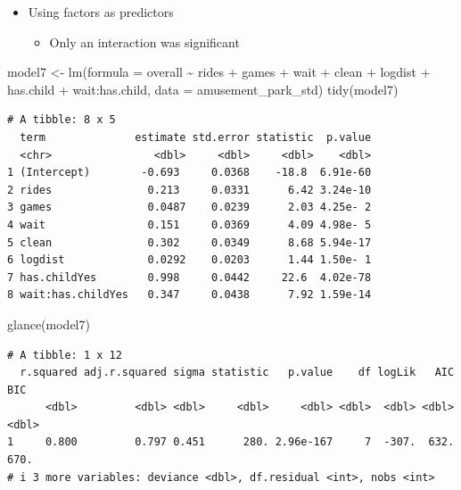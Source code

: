 \documentclass[
  ignorenonframetext,
]{beamer}
\newenvironment{Shaded}{\begin{snugshade}}{\end{snugshade}}
\newcommand{\AttributeTok}[1]{\textcolor[rgb]{0.40,0.45,0.13}{#1}}
\newcommand{\FunctionTok}[1]{\textcolor[rgb]{0.28,0.35,0.67}{#1}}
\newcommand{\NormalTok}[1]{\textcolor[rgb]{0.00,0.23,0.31}{#1}}
\newcommand{\OtherTok}[1]{\textcolor[rgb]{0.00,0.23,0.31}{#1}}
\newcommand{\SpecialCharTok}[1]{\textcolor[rgb]{0.37,0.37,0.37}{#1}}
\providecommand{\tightlist}{%
  \setlength{\itemsep}{0pt}\setlength{\parskip}{0pt}}\usepackage{longtable,booktabs,array}
\begin{document}
\begin{frame}[fragile]{}
\label{section-40}
\begin{itemize}
\item
  Using factors as predictors

  \begin{itemize}
  \tightlist
  \item
    Only an interaction was significant
  \end{itemize}
\end{itemize}

\tiny

\begin{Shaded}
\begin{Highlighting}[]
\NormalTok{model7 }\OtherTok{\textless{}{-}} \FunctionTok{lm}\NormalTok{(}\AttributeTok{formula =}\NormalTok{ overall }\SpecialCharTok{\textasciitilde{}}\NormalTok{ rides }\SpecialCharTok{+}\NormalTok{ games }\SpecialCharTok{+}\NormalTok{ wait }\SpecialCharTok{+}\NormalTok{ clean }\SpecialCharTok{+}\NormalTok{ logdist }\SpecialCharTok{+}\NormalTok{ has.child }\SpecialCharTok{+}
\NormalTok{                       wait}\SpecialCharTok{:}\NormalTok{has.child, }\AttributeTok{data =}\NormalTok{ amusement\_park\_std)}
\FunctionTok{tidy}\NormalTok{(model7)}
\end{Highlighting}
\end{Shaded}

\begin{verbatim}
# A tibble: 8 x 5
  term              estimate std.error statistic  p.value
  <chr>                <dbl>     <dbl>     <dbl>    <dbl>
1 (Intercept)        -0.693     0.0368    -18.8  6.91e-60
2 rides               0.213     0.0331      6.42 3.24e-10
3 games               0.0487    0.0239      2.03 4.25e- 2
4 wait                0.151     0.0369      4.09 4.98e- 5
5 clean               0.302     0.0349      8.68 5.94e-17
6 logdist             0.0292    0.0203      1.44 1.50e- 1
7 has.childYes        0.998     0.0442     22.6  4.02e-78
8 wait:has.childYes   0.347     0.0438      7.92 1.59e-14
\end{verbatim}

\begin{Shaded}
\begin{Highlighting}[]
\FunctionTok{glance}\NormalTok{(model7)}
\end{Highlighting}
\end{Shaded}

\begin{verbatim}
# A tibble: 1 x 12
  r.squared adj.r.squared sigma statistic   p.value    df logLik   AIC   BIC
      <dbl>         <dbl> <dbl>     <dbl>     <dbl> <dbl>  <dbl> <dbl> <dbl>
1     0.800         0.797 0.451      280. 2.96e-167     7  -307.  632.  670.
# i 3 more variables: deviance <dbl>, df.residual <int>, nobs <int>
\end{verbatim}
\end{frame}
\end{document}
